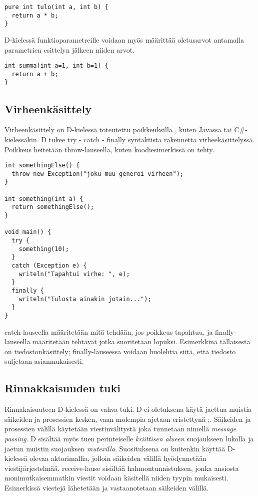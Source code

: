 \documentclass[11pt,oneside,a4paper]{article}
\begin{document}
\begin{verbatim}
pure int tulo(int a, int b) {
  return a * b;
}
\end{verbatim}

D-kielessä funktioparametreille voidaan myös määrittää oletusarvot antamalla parametrien esittelyn jälkeen niiden arvot.
\begin{verbatim}
int summa(int a=1, int b=1) {
  return a + b;
}
\end{verbatim}

\subsection{Virheenkäsittely}
Virheenkäsittely on D-kielessä toteutettu poikkeuksilla \cite{ALE10}, kuten Javassa tai C\#-kielessäkin. D tukee try - catch - finally syntaktista rakennetta virheekäsittelyssä. Poikkeus heitetään throw-lauseella, kuten koodiesimerkissä on tehty.

\begin{verbatim}
int somethingElse() {
  throw new Exception("joku muu generoi virheen");
}

int something(int a) {
  return somethingElse();
}

void main() {
  try {
    something(10);
  }
  catch (Exception e) {
    writeln("Tapahtui virhe: ", e);
  }
  finally {
    writeln("Tulosta ainakin jotain...");
  }
}
\end{verbatim}

catch-lauseella määritetään mitä tehdään, jos poikkeus tapahtuu, ja finally-lauseella määritetään tehtävät jotka suoritetaan lopuksi. Esimerkkinä tällaisesta on tiedostonkäsittely; finally-lauseessa voidaan huolehtia siitä, että tiedosto suljetaan asianmukaisesti.

\subsection{Rinnakkaisuuden tuki}
Rinnakaisuuteen D-kielessä on vahva tuki. D ei oletuksena käytä jaettua muistia säikeiden ja prosessien kesken, vaan molempia ajetaan eristettynä \cite{DLA13};\cite{ALE10}. Säikeiden ja prosessien välillä käytetään viestinvälitystä joka tunnetaan nimellä \textit{message passing}. D sisältää myös tuen perinteiselle \textit{kriittisen alueen} suojaukseen lukolla ja jaetun muistin suojauksen \textit{mutexilla}. Suosituksena on kuitenkin käyttää D-kielessä olevaa aktorimallia, jolloin säikeiden välillä hyödynnetään viestijärjestelmää. receive-lause sisältää hahmontunnistuksen, jonka ansiosta monimutkaisemmatkin viestit voidaan käsitellä niiden tyypin mukaisesti. Esimerkissä viestejä lähetetään ja vastaanotetaan säikeiden välillä.
\end{document}
